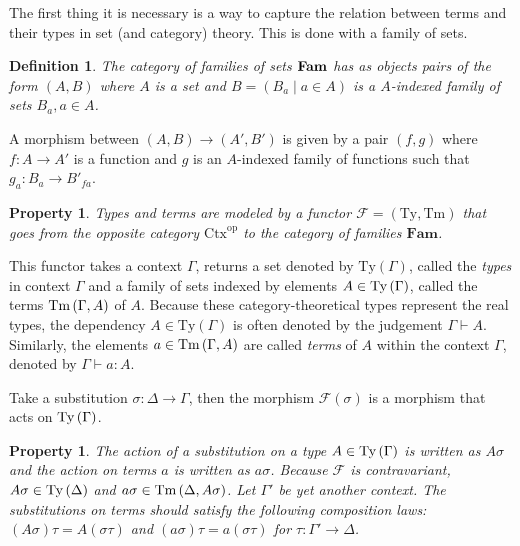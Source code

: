 \documentclass[12pt,a4paper,twoside,xetex]{book}
\newcommand{\keyword}[1]{\emph{#1}\index{#1}}
\newtheorem{definition}[theorem]{Definition}
\newtheorem{property}[theorem]{Property}
\begin{document}
The first thing it is necessary is a way to capture the relation between terms 
and their types in set (and category) theory. This is done with a family of 
sets. 

\begin{definition}
The category of  \keyword{families of sets} $ \text{\textbf{Fam}}$ has as 
objects pairs of the form $\left(A,B\right)$ where $A$ is a set and 
$B=\left(B_{a}\mid a\in A\right)$ is a $A$-indexed family of sets $B_{a},a\in 
A$. 
\end{definition}

A morphism between $\left(A,B\right)\rightarrow\left(A',B'\right)$ is given by 
a pair $\left(f,g\right)$ where $f:A\rightarrow A'$ is a function and $g$ is an 
$A$-indexed family of functions such that $g_{a}:B_{a}\rightarrow B'_{fa}$.


\begin{property}\label{type_functor} Types and terms are modeled by a functor 
$\mathcal{F}=\left(\text{Ty},\text{Tm}\right)$ that goes from the opposite 
category $\text{Ctx}^{\text{op}}$ to the category of families $\textbf{Fam}$.
\end{property}

This functor takes a context $\Gamma$, returns a set denoted by 
$\text{Ty}\left(\Gamma\right)$, called the \keyword{types} in context $\Gamma$ 
and a family of sets indexed by elements $A\in\text{Ty}\left(\Gamma\right)$, called the terms 
$\text{Tm}\left(\Gamma,A\right)$ of $A$. Because these category-theoretical types represent the 
real types, the dependency $A \in \text{Ty}(\Gamma)$ is often denoted by the 
judgement $\Gamma\vdash A$. Similarly, the elements $a\in\text{Tm}\left(\Gamma,A\right)$ are 
called \keyword{terms} of $A$ within the context $\Gamma$, denoted by 
$\Gamma\vdash a:A$.

 Take a substitution $\sigma:\Delta\rightarrow\Gamma$, then the morphism 
$\mathcal{F}(\sigma)$ is a morphism that acts on $\text{Ty}\left(\Gamma\right)$. 

\begin{property}\label{composition_laws}
The action of a substitution on a type $A\in\text{Ty}\left(\Gamma\right)$ is written as 
$A\sigma$ and the action on terms $a$ is written as $a\sigma$. Because 
$\mathcal{F}$ is contravariant, $A \sigma\in \text{Ty}\left(\Delta\right)$ and $a \sigma \in 
\text{Tm}\left(\Delta,A \sigma\right)$. Let $\Gamma '$ be yet another context. The 
substitutions on terms should satisfy
the following composition laws: 
$\left(A\sigma\right)\tau=A\left(\sigma\tau\right)$
and $\left(a\sigma\right)\tau=a\left(\sigma\tau\right)$ for 
$\tau:\Gamma'\rightarrow\Delta$.
\end{property}
\end{document}
